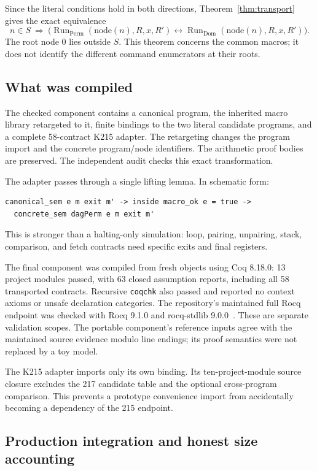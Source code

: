 \documentclass[11pt,letterpaper]{article}
\theoremstyle{definition}\newtheorem{definition}[theorem]{Definition}
\theoremstyle{remark}\newtheorem{remark}[theorem]{Remark}
\newcommand{\Run}{\operatorname{Run}}
\newcommand{\code}[1]{\texttt{\small #1}}
\begin{document}
Since the literal conditions hold in both directions, Theorem~\ref{thm:transport} gives the exact equivalence
\[
 n\in S\ \Longrightarrow\
 \bigl(\Run_{\mathrm{Perm}}(\mathrm{node}(n),R,x,R')
 \leftrightarrow
 \Run_{\mathrm{Dom}}(\mathrm{node}(n),R,x,R')\bigr).
\]
The root node $0$ lies outside $S$. This theorem concerns the common macros; it does not identify the different command enumerators at their roots.

\subsection{What was compiled}

The checked component contains a canonical program, the inherited macro library retargeted to it, finite bindings to the two literal candidate programs, and a complete 58-contract K215 adapter. The retargeting changes the program import and the concrete program/node identifiers. The arithmetic proof bodies are preserved. The independent audit checks this exact transformation.

The adapter passes through a single lifting lemma. In schematic form:
\begin{lstlisting}
canonical_sem e m exit m' -> inside macro_ok e = true ->
  concrete_sem dagPerm e m exit m'
\end{lstlisting}
This is stronger than a halting-only simulation: loop, pairing, unpairing, stack, comparison, and fetch contracts need specific exits and final registers.

The final component was compiled from fresh objects using Coq 8.18.0: 13 project modules passed, with 63 closed assumption reports, including all 58 transported contracts. Recursive \code{coqchk} also passed and reported no context axioms or unsafe declaration categories. The repository's maintained full Rocq endpoint was checked with Rocq 9.1.0 and rocq-stdlib 9.0.0~\cite{verification}. These are separate validation scopes. The portable component's reference inputs agree with the maintained source evidence modulo line endings; its proof semantics were not replaced by a toy model.

The K215 adapter imports only its own binding. Its ten-project-module source closure excludes the 217 candidate table and the optional cross-program comparison. This prevents a prototype convenience import from accidentally becoming a dependency of the 215 endpoint.

\subsection{Production integration and honest size accounting}
\end{document}
